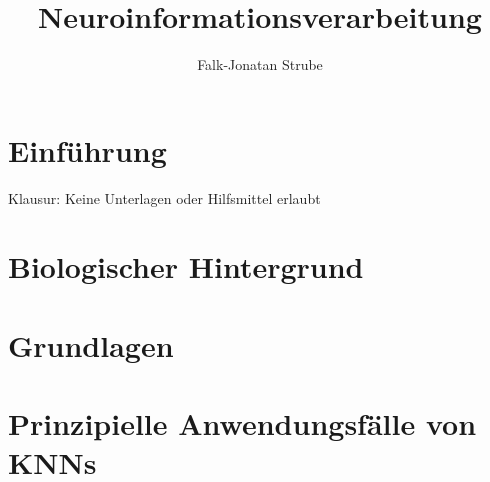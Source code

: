 \documentclass{scrreprt}
\title{Neuroinformations\-verarbeitung}
\author{Falk-Jonatan Strube}
\begin{document}
\maketitle
\tableofcontents

\chapter*{Einführung}
Klausur: Keine Unterlagen oder Hilfsmittel erlaubt

\chapter{Biologischer Hintergrund}


\chapter{Grundlagen}


\chapter{Prinzipielle Anwendungsfälle von KNNs}

\end{document}
